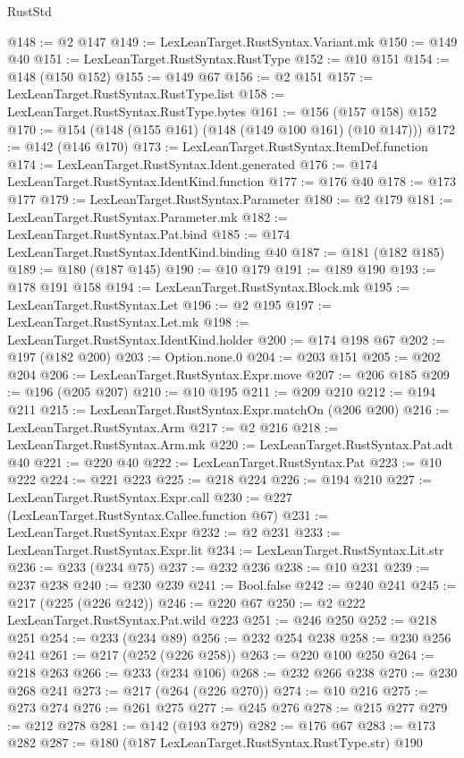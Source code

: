 \begin{lexlean}{RustStd}
\begin{coremodule}
@148 := @2 @147
@149 := LexLeanTarget.RustSyntax.Variant.mk
@150 := @149 @40
@151 := LexLeanTarget.RustSyntax.RustType
@152 := @10 @151
@154 := @148 (@150 @152)
@155 := @149 @67
@156 := @2 @151
@157 := LexLeanTarget.RustSyntax.RustType.list
@158 := LexLeanTarget.RustSyntax.RustType.bytes
@161 := @156 (@157 @158) @152
@170 := @154 (@148 (@155 @161) (@148 (@149 @100 @161) (@10 @147)))
@172 := @142 (@146 @170)
@173 := LexLeanTarget.RustSyntax.ItemDef.function
@174 := LexLeanTarget.RustSyntax.Ident.generated
@176 := @174 LexLeanTarget.RustSyntax.IdentKind.function
@177 := @176 @40
@178 := @173 @177
@179 := LexLeanTarget.RustSyntax.Parameter
@180 := @2 @179
@181 := LexLeanTarget.RustSyntax.Parameter.mk
@182 := LexLeanTarget.RustSyntax.Pat.bind
@185 := @174 LexLeanTarget.RustSyntax.IdentKind.binding @40
@187 := @181 (@182 @185)
@189 := @180 (@187 @145)
@190 := @10 @179
@191 := @189 @190
@193 := @178 @191 @158
@194 := LexLeanTarget.RustSyntax.Block.mk
@195 := LexLeanTarget.RustSyntax.Let
@196 := @2 @195
@197 := LexLeanTarget.RustSyntax.Let.mk
@198 := LexLeanTarget.RustSyntax.IdentKind.holder
@200 := @174 @198 @67
@202 := @197 (@182 @200)
@203 := Option.none.{0}
@204 := @203 @151
@205 := @202 @204
@206 := LexLeanTarget.RustSyntax.Expr.move
@207 := @206 @185
@209 := @196 (@205 @207)
@210 := @10 @195
@211 := @209 @210
@212 := @194 @211
@215 := LexLeanTarget.RustSyntax.Expr.matchOn (@206 @200)
@216 := LexLeanTarget.RustSyntax.Arm
@217 := @2 @216
@218 := LexLeanTarget.RustSyntax.Arm.mk
@220 := LexLeanTarget.RustSyntax.Pat.adt @40
@221 := @220 @40
@222 := LexLeanTarget.RustSyntax.Pat
@223 := @10 @222
@224 := @221 @223
@225 := @218 @224
@226 := @194 @210
@227 := LexLeanTarget.RustSyntax.Expr.call
@230 := @227 (LexLeanTarget.RustSyntax.Callee.function @67)
@231 := LexLeanTarget.RustSyntax.Expr
@232 := @2 @231
@233 := LexLeanTarget.RustSyntax.Expr.lit
@234 := LexLeanTarget.RustSyntax.Lit.str
@236 := @233 (@234 @75)
@237 := @232 @236
@238 := @10 @231
@239 := @237 @238
@240 := @230 @239
@241 := Bool.false
@242 := @240 @241
@245 := @217 (@225 (@226 @242))
@246 := @220 @67
@250 := @2 @222 LexLeanTarget.RustSyntax.Pat.wild @223
@251 := @246 @250
@252 := @218 @251
@254 := @233 (@234 @89)
@256 := @232 @254 @238
@258 := @230 @256 @241
@261 := @217 (@252 (@226 @258))
@263 := @220 @100 @250
@264 := @218 @263
@266 := @233 (@234 @106)
@268 := @232 @266 @238
@270 := @230 @268 @241
@273 := @217 (@264 (@226 @270))
@274 := @10 @216
@275 := @273 @274
@276 := @261 @275
@277 := @245 @276
@278 := @215 @277
@279 := @212 @278
@281 := @142 (@193 @279)
@282 := @176 @67
@283 := @173 @282
@287 := @180 (@187 LexLeanTarget.RustSyntax.RustType.str) @190

\end{coremodule}
\end{lexlean}
